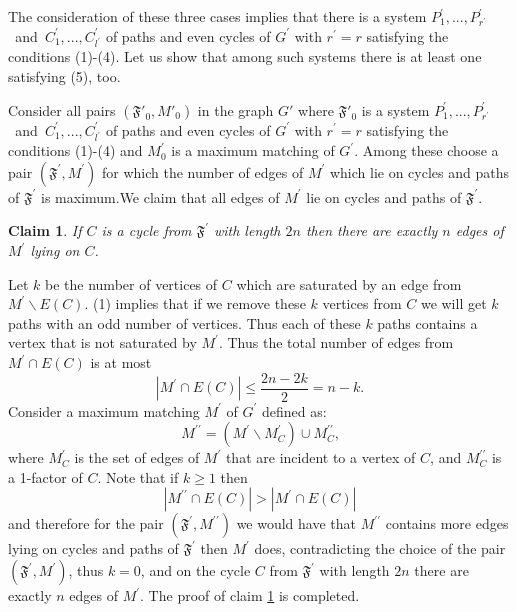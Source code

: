 \documentclass[fleqn,12pt,twoside]{article}
\newtheorem{claim}{Claim}
\newenvironment{proof}[1][Proof.]{\begin{trivlist}
\item[\hskip \labelsep {\bfseries #1}]}{\end{trivlist}}
\begin{document}
\begin{proof}
The consideration of these three cases implies that there is a system $P_{1}^{\prime },...,P_{r^{\prime }}^{\prime }$\textit{\ }and\textit{\ }$C_{1}^{\prime },...,C_{l^{\prime }}^{\prime }$ of paths and even cycles of $G^{\prime }$ with $r^{\prime }=r$ satisfying the conditions (1)-(4).
Let us show that among such systems there is at least one satisfying
(5), too.

Consider all pairs $(\mathfrak{F'}_{0},M'_{0})$ in the
graph $G'$ where $\mathfrak{F'}_{0}$ is a system $P_{1}^{\prime },...,P_{r^{\prime }}^{\prime }$\textit{\ }and\textit{\ }$C_{1}^{\prime },...,C_{l^{\prime }}^{\prime }$ of paths and even cycles of $G^{\prime }$ with $r^{\prime }=r$ satisfying the conditions (1)-(4) and $M_{0}^{\prime }$ is a maximum matching of $G^{\prime }$. Among these
choose a pair $(\mathfrak{F}^{\prime },M^{\prime })$ for which the
number of edges of $M^{\prime }$ which lie on cycles and paths of
$\mathfrak{F}^{\prime }$ is maximum.We claim that all edges of
$M^{\prime }$ lie on cycles and paths of $\mathfrak{F}^{\prime }$.

\begin{claim}
\label{CycleCase}If $C$ is a cycle from $\mathfrak{F}^{\prime }$
with length $2n$ then there are exactly $n$ edges of $M^{\prime }$
lying on $C$.
\end{claim}

\begin{proof}
Let $k$ be the number of vertices of $C$ which are saturated by an
edge from $M^{\prime }\backslash E(C)$. (1) implies that if we
remove these $k$ vertices from $C$ we will get $k$ paths with an odd
number of vertices. Thus
each of these $k$ paths contains a vertex that is not saturated by $M^{\prime }$. Thus the total number of edges from $M^{\prime }\cap
E(C)$ is at most
\begin{equation*}
\left\vert M^{\prime }\cap E(C)\right\vert \leq
\frac{2n-2k}{2}=n-k\text{.}
\end{equation*}Consider a maximum matching $M^{\prime }$ of $G^{\prime }$ defined
as:
\begin{equation*}
M^{\prime \prime }=(M^{\prime }\backslash M_{C}^{\prime })\cup
M_{C}^{\prime \prime }\text{,}
\end{equation*}where $M_{C}^{\prime }$ is the set of edges of $M^{\prime }$ that
are
incident to a vertex of $C$, and $M_{C}^{\prime \prime }$ is a 1-factor of $C $. Note that if $k\geq 1$ then\begin{equation*}
\left\vert M^{\prime \prime }\cap E(C)\right\vert >\left\vert
M^{\prime }\cap E(C)\right\vert
\end{equation*}and therefore for the pair $(\mathfrak{F}^{\prime },M^{\prime \prime
})$ we would have that $M^{\prime \prime }$ contains more edges
lying on cycles and paths of $\mathfrak{F}^{\prime }$ then
$M^{\prime }$ does, contradicting the choice of the pair
$(\mathfrak{F}^{\prime },M^{\prime })$, thus $k=0$, and on the cycle
$C$ from $\mathfrak{F}^{\prime }$ with length $2n$ there are exactly
$n$ edges of $M^{\prime }$. The proof of claim \ref{CycleCase} is
completed.
\end{proof}


\end{proof}
\end{document}
